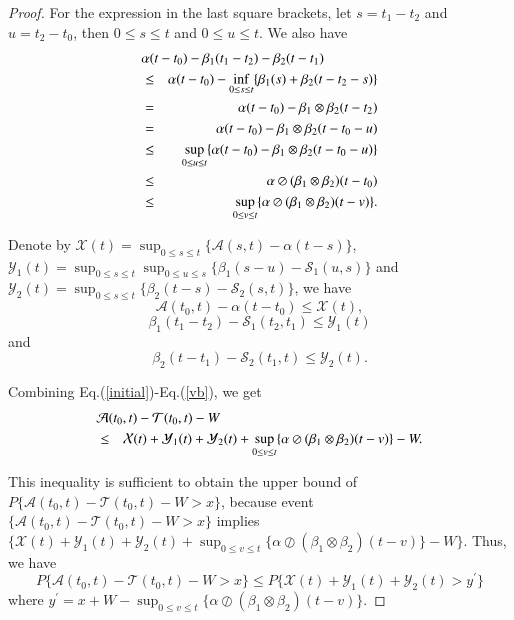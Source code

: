 \documentclass[paper]{ieice}
\newtheorem{proof}{Proof}
\begin{document}
\begin{proof}
For the expression in the last square brackets, let $s=t_{1}-t_{2}$ and $u=t_{2}-t_{0}$, then $0\leq s\leq t$ and $0\leq u\leq t$. We also have
\begin{eqnarray}
  \lefteqn{\alpha(t-t_{0})-\beta_1(t_{1}-t_{2})-\beta_2(t-t_1)}\nonumber\\
  &\leq &\alpha(t-t_{0})-\inf_{0\leq s\leq t}\{\beta_1(s)+\beta_2(t-t_2-s)\}\nonumber\\
  &=&\alpha(t-t_{0})-\beta_1\otimes\beta_2(t-t_{2})\nonumber\\
  &=&\alpha(t-t_{0})-\beta_1\otimes\beta_2(t-t_{0}-u)\nonumber\\
  &\leq & \sup_{0\leq u\leq t}\{\alpha(t-t_0)-\beta_1\otimes\beta_2(t-t_0-u)\}\nonumber\\
  &\leq& \alpha\oslash(\beta_1\otimes\beta_2)(t-t_0)\nonumber\\
  &\leq & \sup_{0\leq v\leq t}\{\alpha\oslash(\beta_1\otimes\beta_2)(t-v)\}.\label{curve}
\end{eqnarray}

Denote by $\mathcal{X}(t)=\sup_{0\leq s\leq t}\{\mathcal{A}(s,t)-\alpha(t-s)\}$, $\mathcal{Y}_1(t)=\sup_{0\leq s\leq t}\sup_{0\leq u\leq s}\{\beta_1(s-u)-\mathcal{S}_1(u,s)\}$ and $\mathcal{Y}_2(t)=\sup_{0\leq s\leq t}\{\beta_2(t-s)-\mathcal{S}_2(s,t)\}$, we have
\begin{equation}\label{vbc}
\mathcal{A}(t_{0},t)-\alpha(t-t_{0})\leq \mathcal{X}(t),
\end{equation}
\begin{equation}\label{mb}
\beta_1(t_1-t_{2})-\mathcal{S}_1(t_{2},t_1)\leq \mathcal{Y}_1(t)
\end{equation}
and
\begin{equation}\label{vb}
\beta_2(t-t_{1})-\mathcal{S}_2(t_{1},t)\leq \mathcal{Y}_2(t).
\end{equation}

Combining Eq.(\ref{initial})-Eq.(\ref{vb}), we get
\begin{eqnarray*}
\lefteqn{\mathcal{A}(t_0,t)-\mathcal{T}(t_0,t)-W}\\
&\leq& \mathcal{X}(t)+\mathcal{Y}_1(t)+\mathcal{Y}_2(t)+\sup_{0\leq v\leq t}\{\alpha\oslash(\beta_1\otimes\beta_2)(t-v)\}-W.
\end{eqnarray*}

This inequality is sufficient to obtain the upper bound of $P\{\mathcal{A}(t_0,t)-\mathcal{T}(t_0,t)-W>x\}$, because event $\{\mathcal{A}(t_0,t)-\mathcal{T}(t_0,t)-W>x\}$ implies $\{\mathcal{X}(t)+\mathcal{Y}_1(t)+\mathcal{Y}_2(t)+\sup_{0\leq v\leq t}\{\alpha\oslash(\beta_1\otimes\beta_2)(t-v)\}-W\}$. Thus, we have
$$P\{\mathcal{A}(t_0,t)-\mathcal{T}(t_0,t)-W>x\}\leq P\{\mathcal{X}(t)+\mathcal{Y}_1(t)+\mathcal{Y}_2(t)>y^\prime\}$$
where $y^\prime=x+W-\sup_{0\leq v\leq t}\{\alpha\oslash(\beta_1\otimes\beta_2)(t-v)\}$.


\end{proof}
\end{document}
